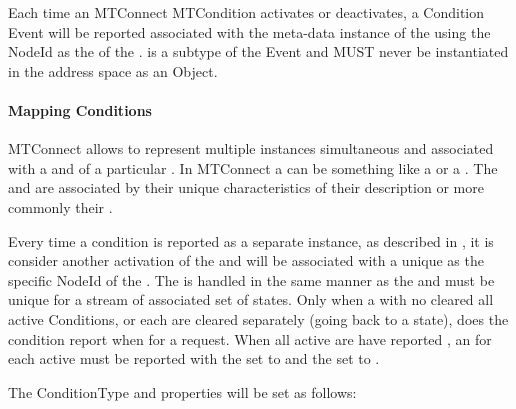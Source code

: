 Each time an MTConnect \gls{MTCondition} activates or deactivates, a \gls{Condition} \gls{Event} will be reported associated with the meta-data instance of the  using the \gls{NodeId} as the  of the .   is a subtype of the \gls{Event} and MUST never be instantiated in the address space as an \gls{Object}.

\paragraph{Mapping Conditions}

MTConnect allows  to represent multiple instances simultaneous  and  associated with a  and of a particular . In MTConnect a  can be something like a  or a . The   and  are associated by their unique characteristics of their description or more commonly their .

Every time a condition is reported as a separate instance, as described in \cite{MTCPart3}, it is consider another activation of the  and will be associated with a unique  as the specific \gls{NodeId} of the . The  is handled in the same manner as the  and must be unique for a stream of associated  set of states. Only when a  with no  cleared all active Conditions, or each are cleared separately (going back to a  state), does the condition report  when for a  request. When all active  are have reported , an  for each active  must be reported with the  set to  and the  set to .

The \gls{ConditionType} and  properties will be set as follows:

